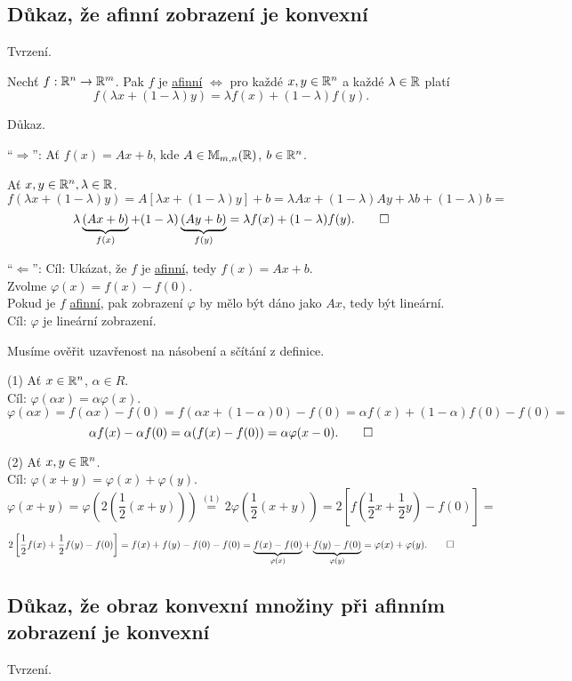 \subsection{Důkaz, že afinní zobrazení je konvexní}
Tvrzení.

Nechť $f: \mathbb{R}^n \rightarrow \mathbb{R}^m$. Pak $f$ je \hyperref[sec:afin]{afinní} $\iff$ pro každé $x,y \in \mathbb{R}^n$ a každé
$\lambda \in \mathbb{R}$ platí
\[f(\lambda x + (1-\lambda) y) =\lambda f(x) + (1-\lambda) f(y)\text{.}\]

Důkaz.

\enquote{$\Rightarrow$}: Ať $f(x) = Ax + b$, kde $A \in \mathbb{M}_{m,n} (\mathbb{R})$, $b \in \mathbb{R}^n$.

Ať $x, y \in \mathbb{R}^n, \lambda \in \mathbb{R}$.
\[
    f(\lambda x + (1 - \lambda) y) = A [\lambda x + (1-\lambda) y] + b = \lambda A x + (1-\lambda)Ay + \lambda b +
    (1-\lambda)b =
\]
\[
    \lambda \underbrace{(Ax + b)}_{f(x)} + (1-\lambda)\underbrace{(Ay + b)}_{f(y)} = \lambda f(x) + (1-\lambda)f(y). \qed
\]

\enquote{$\Leftarrow$}:
Cíl: Ukázat, že $f$ je \hyperref[sec:afin]{afinní}, tedy $f(x) = Ax + b$.\\
Zvolme $\varphi(x) = f(x) - f(0)$.\\
Pokud je $f$ \hyperref[sec:afin]{afinní}, pak zobrazení $\varphi$ by mělo být dáno jako $Ax$, tedy být lineární.\\
Cíl: $\varphi$ je lineární zobrazení.

Musíme ověřit uzavřenost na násobení a sčítání z definice.

(1) Ať $x \in \mathbb{R}^n$, $\alpha \in R$.\\
Cíl: $\varphi(\alpha x) = \alpha \varphi(x)$.
\[
    \varphi(\alpha x) = f(\alpha x) - f(0) = f(\alpha x + (1-\alpha)0) - f(0) = \alpha f(x) + (1-\alpha)f(0) - f(0) =
\]
\[
    \alpha f(x) - \alpha f(0) = \alpha (f(x) - f(0)) = \alpha \varphi (x-0). \qed
\]

(2) Ať $x, y \in \mathbb{R}^n$.\\
Cíl: $\varphi(x+y) = \varphi(x) + \varphi(y)$.
\[
    \varphi(x+y) = 
    \varphi \left(2 \left(\frac{1}{2} (x+y)\right)\right) \stackrel{(1)}{=} 2 \varphi \left(\frac{1}{2} (x+y)\right) =
    2 \left[f(\frac{1}{2}x + \frac{1}{2}y) - f(0)\right] = 
\]
\[
    2 \left[\frac{1}{2} f(x) + \frac{1}{2}f(y) - f(0) \right] = f(x) + f(y) - f(0) - f(0) = 
    \underbrace{f(x) - f(0)}_{\varphi(x)} + \underbrace{f(y) - f(0)}_{\varphi(y)} =
    \varphi(x) + \varphi(y). \qed
\]

\subsection{Důkaz, že obraz konvexní množiny při afinním zobrazení je konvexní}
Tvrzení.

